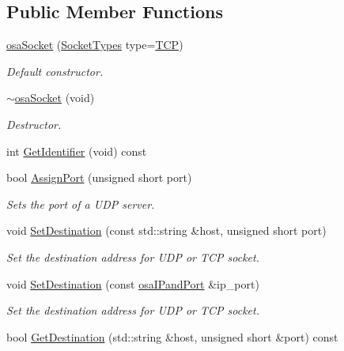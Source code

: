 \subsection*{Public Member Functions}
\begin{DoxyCompactItemize}
\item 
\hyperlink{classosa_socket_a978ed4ba465032ca6061fa6486464840}{osa\+Socket} (\hyperlink{classosa_socket_adeb99e6a5b2d4e503e0308ccb9677a00}{Socket\+Types} type=\hyperlink{classosa_socket_adeb99e6a5b2d4e503e0308ccb9677a00a285ce3d0ac4094f708fa3f7b2f222430}{T\+C\+P})
\begin{DoxyCompactList}\small\item\em Default constructor. \end{DoxyCompactList}\item 
\hyperlink{classosa_socket_a78099904ded5203835307eac712c4a14}{$\sim$osa\+Socket} (void)
\begin{DoxyCompactList}\small\item\em Destructor. \end{DoxyCompactList}\item 
int \hyperlink{classosa_socket_a109a21812219017a15fea0e38aa0c3c6}{Get\+Identifier} (void) const 
\item 
bool \hyperlink{classosa_socket_ac057f23deeeb355089a5f0b36b82c1eb}{Assign\+Port} (unsigned short port)
\begin{DoxyCompactList}\small\item\em Sets the port of a U\+D\+P server. \end{DoxyCompactList}\item 
void \hyperlink{classosa_socket_a5a02b283355bf2beff6217bb2e01c03a}{Set\+Destination} (const std\+::string \&host, unsigned short port)
\begin{DoxyCompactList}\small\item\em Set the destination address for U\+D\+P or T\+C\+P socket. \end{DoxyCompactList}\item 
void \hyperlink{classosa_socket_ac86d6d1c9c1155aa3f6fb5fd396fb2c9}{Set\+Destination} (const \hyperlink{structosa_i_pand_port}{osa\+I\+Pand\+Port} \&ip\+\_\+port)
\begin{DoxyCompactList}\small\item\em Set the destination address for U\+D\+P or T\+C\+P socket. \end{DoxyCompactList}\item 
bool \hyperlink{classosa_socket_a1f354c34c89fbbd12f3dee0be6787596}{Get\+Destination} (std\+::string \&host, unsigned short \&port) const 

\end{DoxyCompactItemize}
